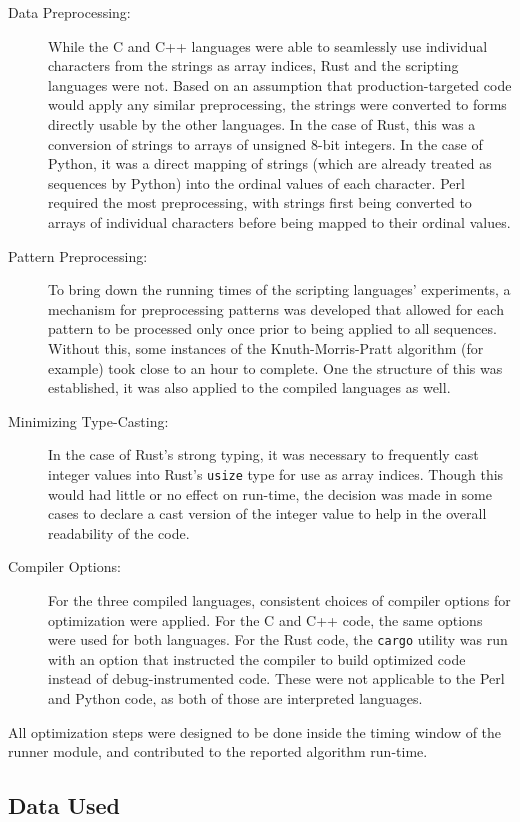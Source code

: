 \begin{description}
\item[Data Preprocessing:] While the C and C++ languages were able to seamlessly use individual characters from the strings as array indices, Rust and the scripting languages were not. Based on an assumption that production-targeted code would apply any similar preprocessing, the strings were converted to forms directly usable by the other languages. In the case of Rust, this was a conversion of strings to arrays of unsigned 8-bit integers. In the case of Python, it was a direct mapping of strings (which are already treated as sequences by Python) into the ordinal values of each character. Perl required the most preprocessing, with strings first being converted to arrays of individual characters before being mapped to their ordinal values.
\item[Pattern Preprocessing:] To bring down the running times of the scripting languages' experiments, a mechanism for preprocessing patterns was developed that allowed for each pattern to be processed only once prior to being applied to all sequences. Without this, some instances of the Knuth-Morris-Pratt algorithm (for example) took close to an hour to complete. One the structure of this was established, it was also applied to the compiled languages as well.
\item[Minimizing Type-Casting:] In the case of Rust's strong typing, it was necessary to frequently cast integer values into Rust's \texttt{usize} type for use as array indices. Though this would had little or no effect on run-time, the decision was made in some cases to declare a cast version of the integer value to help in the overall readability of the code.
\item[Compiler Options:] For the three compiled languages, consistent choices of compiler options for optimization were applied. For the C and C++ code, the same options were used for both languages. For the Rust code, the \texttt{cargo} utility was run with an option that instructed the compiler to build optimized code instead of debug-instrumented code. These were not applicable to the Perl and Python code, as both of those are interpreted languages.
\end{description}

All optimization steps were designed to be done inside the timing window of the runner module, and contributed to the reported algorithm run-time.

\subsection{Data Used}
\label{subsec:data}

